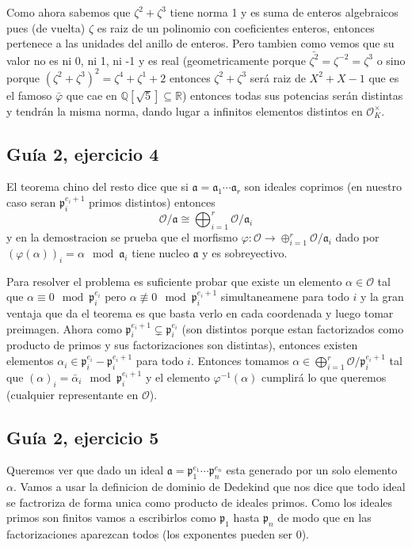 \documentclass[12pt]{amsart}
\newcommand{\QQ}{\mathbb{Q}}
\newcommand{\RR}{\mathbb{R}}
\newcommand{\pp}{\mathfrak{p}}
\newcommand{\aaa}{\mathfrak{a}}
\newcommand{\OO}{\mathcal{O}}
\newcommand{\lp}{\left(}
\newcommand{\rp}{\right)}
\theoremstyle{plain}
\begin{document}
Como ahora sabemos que $\zeta^2+\zeta^3$ tiene norma 1 y es suma de 
enteros algebraicos pues (de vuelta) $\zeta$ es raiz de un polinomio con
coeficientes enteros, entonces pertenece a las unidades del anillo de 
enteros. Pero tambien como vemos que su valor no es ni 0, ni 1, ni -1 y 
es real (geometricamente porque $\bar{\zeta^2}=\zeta^{-2} = 
\zeta^3$ o sino porque 
$(\zeta^2+\zeta^3)^2=\zeta^4+\zeta^1+2$ entonces $\zeta^2+\zeta^3$ 
será raiz de $X^2+X-1$ que es el famoso $\bar{\varphi}$ que cae en 
$\QQ[\sqrt{5}]\subseteq \RR$) entonces todas sus potencias serán 
distintas y tendrán la misma norma, dando lugar a infinitos 
elementos distintos en $\OO_K^\times$.


\subsection*{Guía 2, ejercicio 4}

El teorema chino del resto dice que si $\aaa = \aaa_1 \cdots \aaa_r$ 
son ideales coprimos (en 
nuestro caso seran $\pp_i^{e_i+1}$ primos distintos) entonces 
$$\OO / \aaa \cong \bigoplus_{i=1}^r \OO / \aaa_i$$
y en la demostracion se prueba que el morfismo $\varphi:\OO\to
\oplus_{i=1}^r \OO / \aaa_i$ dado por $\lp\varphi(\alpha)\rp_i=\alpha\mod 
\aaa_i$ tiene nucleo $\aaa$ y es sobreyectivo.

Para resolver el problema es suficiente probar que existe un elemento 
$\alpha \in \OO$ tal que $\alpha \equiv0\mod \pp_i^{e_i}$ pero 
$\alpha \not\equiv 0 \mod \pp_i^{e_i+1}$ 
simultaneamene para todo $i$ y la gran ventaja que da el teorema es que 
basta verlo en cada coordenada y luego tomar preimagen. Ahora como 
$\pp_i^{e_i+1} \subsetneq \pp_i^{e_i}$ (son distintos porque estan 
factorizados
como producto de primos y sus factorizaciones son distintas), entonces 
existen elementos $\alpha_i \in \pp_i^{e_i} - \pp_i^{e_i+1}$ para todo $i$.
Entonces tomamos $\alpha \in \bigoplus_{i=1}^r \OO / \pp_i^{e_i+1}$ tal que
$(\alpha)_i = \bar\alpha_i\mod \pp_i^{e_i+1}$ y el elemento $\varphi^{-1}
(\alpha)$ cumplirá lo que queremos (cualquier representante en $\OO$).


\subsection*{Guía 2, ejercicio 5}

Queremos ver que dado un ideal $\aaa = \pp_1^{e_1}\cdots\pp_n^{e_n}$ 
esta generado por un solo elemento $\alpha$. Vamos a usar la 
definicion de dominio de Dedekind que nos dice que todo ideal se 
factroriza de forma unica como producto de ideales primos.
Como los ideales primos son finitos vamos a escribirlos como $\pp_1$
hasta $\pp_n$ de modo que en las factorizaciones aparezcan todos (los
exponentes pueden ser $0$).
\end{document}
